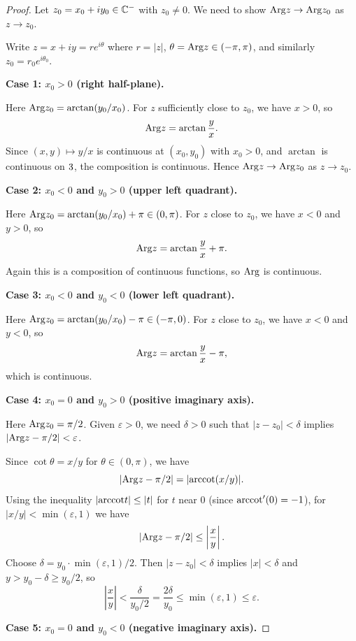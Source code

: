 \documentclass{article}
\begin{document}
\begin{proof}
  Let $z_0 = x_0 + iy_0 \in \mathbb{C}^-$ with $z_0 \ne 0$.
  We need to show $\mathrm{Arg} z \to \mathrm{Arg} z_0$ as $z \to z_0$.

  Write $z = x + iy = re^{i\theta}$ where $r = |z|$, $\theta = \mathrm{Arg} z
  \in (-\pi, \pi)$,
  and similarly $z_0 = r_0 e^{i\theta_0}$.

  \textbf{Case 1: $x_0 > 0$ (right half-plane).}

  Here $\mathrm{Arg} z_0 = \arctan(y_0/x_0)$.
  For $z$ sufficiently close to $z_0$, we have $x > 0$, so
  \[
    \mathrm{Arg} z = \arctan\frac{y}{x}.
  \]
  Since $(x,y) \mapsto y/x$ is continuous at $(x_0,y_0)$ with $x_0 > 0$,
  and $\arctan$ is continuous on $3$, the composition is continuous.
  Hence $\mathrm{Arg} z \to \mathrm{Arg} z_0$ as $z \to z_0$.

  \textbf{Case 2: $x_0 < 0$ and $y_0 > 0$ (upper left quadrant).}

  Here $\mathrm{Arg} z_0 = \arctan(y_0/x_0) + \pi \in (0,\pi)$.
  For $z$ close to $z_0$, we have $x < 0$ and $y > 0$, so
  \[
    \mathrm{Arg} z = \arctan\frac{y}{x} + \pi.
  \]
  Again this is a composition of continuous functions, so $\mathrm{Arg}$ is continuous.

  \textbf{Case 3: $x_0 < 0$ and $y_0 < 0$ (lower left quadrant).}

  Here $\mathrm{Arg} z_0 = \arctan(y_0/x_0) - \pi \in (-\pi, 0)$.
  For $z$ close to $z_0$, we have $x < 0$ and $y < 0$, so
  \[
    \mathrm{Arg} z = \arctan\frac{y}{x} - \pi,
  \]
  which is continuous.

  \textbf{Case 4: $x_0 = 0$ and $y_0 > 0$ (positive imaginary axis).}

  Here $\mathrm{Arg} z_0 = \pi/2$. Given $\varepsilon > 0$, we need $\delta >
  0$ such that
  $|z - z_0| < \delta$ implies $|\mathrm{Arg} z - \pi/2| < \varepsilon$.

  Since $\cot\theta = x/y$ for $\theta \in (0,\pi)$, we have
  \[
    |\mathrm{Arg} z - \pi/2| = |\mathrm{arccot}(x/y)|.
  \]
  Using the inequality $|\mathrm{arccot} t| \le |t|$ for $t$ near $0$ (since
  $\mathrm{arccot}'(0) = -1$),
  for $|x/y| < \min(\varepsilon, 1)$ we have
  \[
    |\mathrm{Arg} z - \pi/2| \le \left|\frac{x}{y}\right|.
  \]
  Choose $\delta = y_0 \cdot \min(\varepsilon, 1)/2$. Then $|z - z_0|
  < \delta$ implies
  $|x| < \delta$ and $y > y_0 - \delta \ge y_0/2$, so
  \[
    \left|\frac{x}{y}\right| < \frac{\delta}{y_0/2}
    = \frac{2\delta}{y_0}
    \le \min(\varepsilon, 1) \le \varepsilon.
  \]

  \textbf{Case 5: $x_0 = 0$ and $y_0 < 0$ (negative imaginary axis).}


\end{proof}
\end{document}
